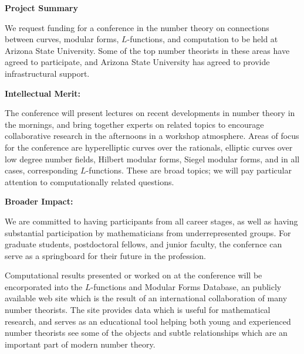 \documentclass[12pt]{article}
\begin{document}
\begin{center}
\textbf{\large  Project Summary}
\end{center}
\bigskip

We request funding for a conference in the number theory on connections
between curves, modular forms, $L$-functions, and computation to be
held at Arizona State University.  Some of the top number theorists in
these areas have agreed to participate, and Arizona State University
has agreed to provide infrastructural support.


\medskip
\noindent\textbf{Intellectual Merit:}

\medskip

The conference will present lectures on recent developments in number theory
in the mornings, and
bring together experts on related topics to encourage collaborative
research in the afternoons in a workshop atmosphere.  Areas of focus for 
the conference are hyperelliptic curves over the rationals, elliptic
curves over low degree number fields, Hilbert modular forms, Siegel
modular forms, and in all cases, corresponding $L$-functions.  These
are broad topics; we will pay particular attention to computationally
related questions.

\medskip
\noindent\textbf{Broader Impact:}

\medskip

We are committed to having participants from all career stages, as well
as having substantial participation by mathematicians from underrepresented
groups.  For graduate students, postdoctoral fellows, and junior faculty,
the confernce can serve as a springboard for their future in the profession.

Computational results presented or worked on at the conference will be
encorporated into the $L$-functions and Modular Forms Database, an
publicly available web site which is the result of an international
collaboration of many number theorists.  The site provides data which is
useful for mathematical research, and serves as an educational tool
helping both young and experienced number theorists see some of the
objects and subtle relationships which are an important part of modern
number theory.
\end{document}
